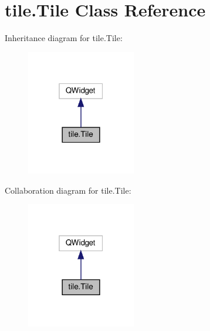 \hypertarget{classtile_1_1_tile}{}\section{tile.\+Tile Class Reference}
\label{classtile_1_1_tile}


Inheritance diagram for tile.\+Tile\+:
\nopagebreak
\begin{figure}[H]
\begin{center}
\leavevmode
\includegraphics[width=135pt]{classtile_1_1_tile__inherit__graph}
\end{center}
\end{figure}


Collaboration diagram for tile.\+Tile\+:
\nopagebreak
\begin{figure}[H]
\begin{center}
\leavevmode
\includegraphics[width=135pt]{classtile_1_1_tile__coll__graph}
\end{center}
\end{figure}
